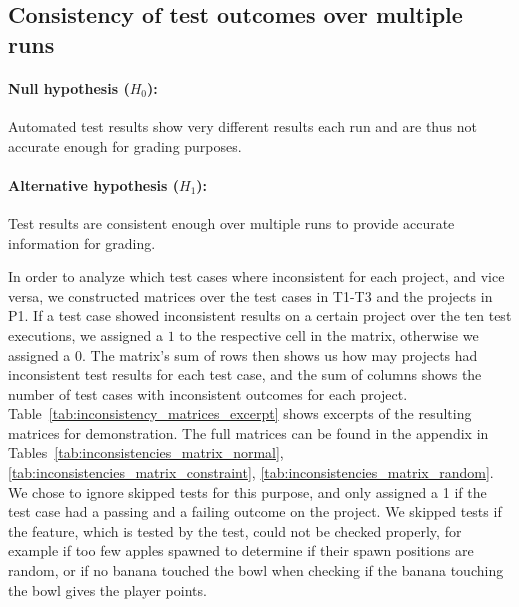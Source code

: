 \clearpage

\subsection{Consistency of test outcomes over multiple runs}

\paragraph{Null hypothesis ($H_0$):}
Automated test results show very different results each run and are thus not accurate enough for grading purposes.
\vspace{-\medskipamount}
\paragraph{Alternative hypothesis ($H_1$):}
Test results are consistent enough over multiple runs to provide accurate information for grading.
\parspace

In order to analyze which test cases where inconsistent for each project, and vice versa,
we constructed matrices over the test cases in T1-T3 and the projects in P1.
If a test case showed inconsistent results on a certain project over the ten test executions,
we assigned a $1$ to the respective cell in the matrix, otherwise we assigned a 0.
The matrix's sum of rows then shows us how may projects had inconsistent test results for each test case,
and the sum of columns shows the number of test cases with inconsistent outcomes for each project.
Table~\ref{tab:inconsistency_matrices_excerpt} shows excerpts of the resulting matrices for demonstration.
The full matrices can be found in the appendix in Tables~\ref{tab:inconsistencies_matrix_normal}, \ref{tab:inconsistencies_matrix_constraint}, \ref{tab:inconsistencies_matrix_random}.
We chose to ignore skipped tests for this purpose,
and only assigned a 1 if the test case had a passing and a failing outcome on the project.
We skipped tests if the feature, which is tested by the test, could not be checked properly,
for example if too few apples spawned to determine if their spawn positions are random,
or if no banana touched the bowl when checking if the banana touching the bowl gives the player points.
\parspace

